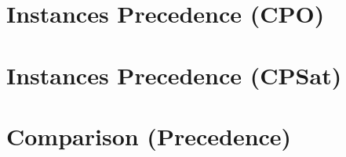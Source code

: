 \documentclass[a4paper]{article}
\begin{document}
\section{Instances Precedence (CPO)}


\section{Instances Precedence (CPSat)}


\section{Comparison (Precedence)}

\end{document}

